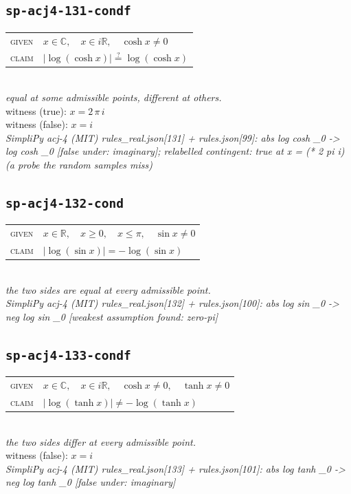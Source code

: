 \documentclass[11pt]{article}
\begin{document}
\subsection*{\texttt{sp-acj4-131-condf}}
\begin{tabular}{@{}l@{\quad}l@{}}
\textsc{given} & $x \in \mathbb{C},\quad x \in i\mathbb{R},\quad \cosh x \neq 0$ \\[4pt]
\textsc{claim} & $\displaystyle \left|\log\left(\cosh x\right)\right| \overset{?}{=} \log\left(\cosh x\right)$ \\
\end{tabular}\\[2pt]
{\small\emph{equal at some admissible points, different at others.}}\\
{\footnotesize\color{gray}witness (true): $x = 2 \, \pi \, i$}\\
{\footnotesize\color{gray}witness (false): $x = i$}\\
\emph{SimpliPy acj-4 (MIT) rules\_real.json[131] + rules.json[99]: abs log cosh \_0  ->  log cosh \_0  [false under: imaginary]; relabelled contingent: true at x = (* 2 pi i) (a probe the random samples miss)}\\

\subsection*{\texttt{sp-acj4-132-cond}}
\begin{tabular}{@{}l@{\quad}l@{}}
\textsc{given} & $x \in \mathbb{R},\quad x \ge 0,\quad x \le \pi,\quad \sin x \neq 0$ \\[4pt]
\textsc{claim} & $\displaystyle \left|\log\left(\sin x\right)\right| = -\log\left(\sin x\right)$ \\
\end{tabular}\\[2pt]
{\small\emph{the two sides are equal at every admissible point.}}\\
\emph{SimpliPy acj-4 (MIT) rules\_real.json[132] + rules.json[100]: abs log sin \_0  ->  neg log sin \_0  [weakest assumption found: zero-pi]}\\

\subsection*{\texttt{sp-acj4-133-condf}}
\begin{tabular}{@{}l@{\quad}l@{}}
\textsc{given} & $x \in \mathbb{C},\quad x \in i\mathbb{R},\quad \cosh x \neq 0,\quad \tanh x \neq 0$ \\[4pt]
\textsc{claim} & $\displaystyle \left|\log\left(\tanh x\right)\right| \neq -\log\left(\tanh x\right)$ \\
\end{tabular}\\[2pt]
{\small\emph{the two sides differ at every admissible point.}}\\
{\footnotesize\color{gray}witness (false): $x = i$}\\
\emph{SimpliPy acj-4 (MIT) rules\_real.json[133] + rules.json[101]: abs log tanh \_0  ->  neg log tanh \_0  [false under: imaginary]}\\
\end{document}
